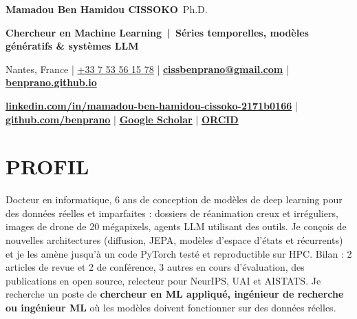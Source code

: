 \documentclass[10pt,a4paper]{article}
\newcommand{\portfolio}{benprano.github.io}   %
\begin{document}
{\LARGE\bfseries Mamadou Ben Hamidou {\color{accent}CISSOKO}}\,{\large\color{muted} Ph.D.}\par\vspace{2pt}
{\color{accent}\bfseries Chercheur en Machine Learning \,|\, Séries temporelles, modèles génératifs \& systèmes LLM}\par\vspace{3pt}
{\small Nantes, France \;|\; \href{tel:+33753561578}{+33 7 53 56 15 78} \;|\; \href{mailto:cissbenprano@gmail.com}{\textbf{cissbenprano@gmail.com}} \;|\; \href{https://\portfolio}{\textcolor{accent}{\textbf{\portfolio}}}\par
\href{https://www.linkedin.com/in/mamadou-ben-hamidou-cissoko-2171b0166/}{\textcolor{accent}{\textbf{linkedin.com/in/mamadou-ben-hamidou-cissoko-2171b0166}}} \;|\;
\href{https://github.com/benprano}{\textcolor{accent}{\textbf{github.com/benprano}}} \;|\;
\href{https://scholar.google.com/citations?user=k_2SuOkAAAAJ\&hl=en\&oi=sra}{\textcolor{accent}{\textbf{Google Scholar}}} \;|\;
\href{https://orcid.org/0009-0002-1840-9325}{\textcolor{accent}{\textbf{ORCID}}}\par}
\vspace{2pt}{\color{accent}\rule{\linewidth}{1.2pt}}

\section{PROFIL}
{\small Docteur en informatique, 6 ans de conception de modèles de deep learning pour des données réelles et imparfaites : dossiers de réanimation creux et irréguliers, images de drone de 20 mégapixels, agents LLM utilisant des outils. Je conçois de nouvelles architectures (diffusion, JEPA, modèles d’espace d’états et récurrents) et je les amène jusqu’à un code PyTorch testé et reproductible sur HPC. Bilan : 2 articles de revue et 2 de conférence, 3 autres en cours d’évaluation, des publications en open source, relecteur pour NeurIPS, UAI et AISTATS. Je recherche un poste de \textbf{chercheur en ML appliqué, ingénieur de recherche ou ingénieur ML} où les modèles doivent fonctionner sur des données réelles.}

\end{document}
